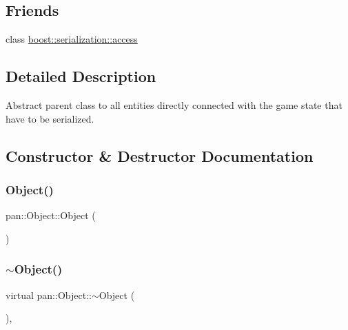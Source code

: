 \subsection*{Friends}
\begin{DoxyCompactItemize}
\item 
class \hyperlink{classpan_1_1_object_ac98d07dd8f7b70e16ccb9a01abf56b9c}{boost\+::serialization\+::access}
\end{DoxyCompactItemize}


\subsection{Detailed Description}
Abstract parent class to all entities directly connected with the game state that have to be serialized. 

\subsection{Constructor \& Destructor Documentation}
\mbox{\label{classpan_1_1_object_a2ee7680fdf1f046d5f6f4a8bd5529725}} 
\subsubsection{\texorpdfstring{Object()}{Object()}}
{\footnotesize\ttfamily pan\+::\+Object\+::\+Object (\begin{DoxyParamCaption}{ }\end{DoxyParamCaption})\hspace{0.3cm}{\ttfamily [inline]}}

\mbox{\label{classpan_1_1_object_a88ddecef476f026deda410f3b95fe9ca}} 
\subsubsection{\texorpdfstring{$\sim$\+Object()}{~Object()}}
{\footnotesize\ttfamily virtual pan\+::\+Object\+::$\sim$\+Object (\begin{DoxyParamCaption}{ }\end{DoxyParamCaption})\hspace{0.3cm}{\ttfamily [inline]}, {\ttfamily [virtual]}}



